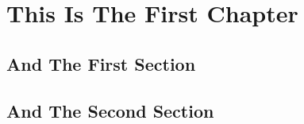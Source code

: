\chapter{This Is The First Chapter}
\section{And The First Section}
\lipsum
\section{And The Second Section}
\lipsum
